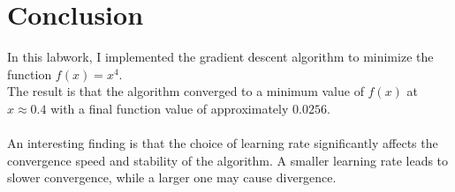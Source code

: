 \documentclass{article}
\begin{document}
\section{Conclusion}

In this labwork, I implemented the gradient descent algorithm to minimize the function $f(x) = x^4$.\\
The result is that the algorithm converged to a minimum value of $f(x)$ at $x \approx 0.4$ with a final function value of approximately $0.0256$.\\
\\
An interesting finding is that the choice of learning rate significantly affects the convergence speed and stability of the algorithm. A smaller learning rate leads to slower convergence, while a larger one may cause divergence.
\end{document}
